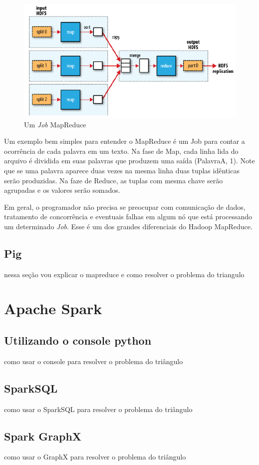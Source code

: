 \begin{figure}
	\centering
	\includegraphics[width=\linewidth]{./mapreduce_job.png}
	\caption{Um \textit{Job} MapReduce}
	\label{fig:mapreduce}
\end{figure}

Um exemplo bem simples para entender o MapReduce é um Job para contar a ocorrência de cada palavra em um texto. Na fase de Map, cada linha lida do arquivo é dividida em suas palavras que produzem uma saída (PalavraA, 1). Note que se uma palavra aparece duas vezes na mesma linha duas tuplas idênticas serão produzidas. Na faze de Reduce, as tuplas com mesma chave serão agrupadas e os valores serão somados. 

Em geral, o programador não precisa se preocupar com comunicação de dados, tratamento de concorrência e eventuais falhas em algum nó que está processando um determinado \textit{Job}. Esse é um dos grandes diferenciais do Hadoop MapReduce. 

\subsection{Pig}
nessa seção vou explicar o mapreduce e como resolver o problema do triangulo

\section{Apache Spark}
\subsection{Utilizando o console python}
como usar o console para resolver o problema do triângulo
\subsection{SparkSQL}
como usar o SparkSQL para resolver o problema do triângulo
\subsection{Spark GraphX}
como usar o GraphX para resolver o problema do triângulo

